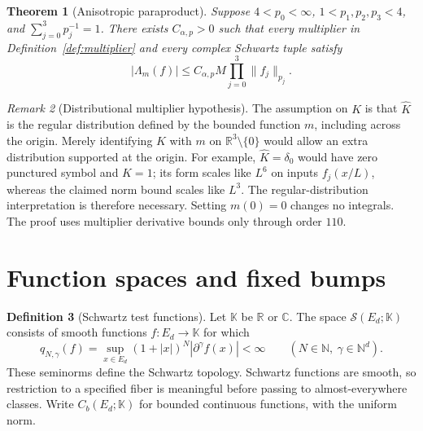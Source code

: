 \documentclass[12pt,reqno]{amsart}
\theoremstyle{plain}
\newtheorem{theorem}{Theorem}[section]
\theoremstyle{definition}
\newtheorem{definition}[theorem]{Definition}
\theoremstyle{remark}
\newtheorem{remark}[theorem]{Remark}
\numberwithin{equation}{section}
\newcommand{\R}{\mathbb R}
\newcommand{\C}{\mathbb C}
\newcommand{\N}{\mathbb N}
\newcommand{\Sp}{\mathcal S}
\begin{document}
\begin{theorem}[Anisotropic paraproduct]\label{thm:main}
Suppose $4<p_0<\infty$, $1<p_1,p_2,p_3<4$, and
$\sum_{j=0}^3p_j^{-1}=1$. There exists $C_{\alpha,p}>0$ such that
every multiplier in Definition~\ref{def:multiplier} and every complex
Schwartz tuple satisfy
\[
 |\Lambda_m(f)|\le C_{\alpha,p}M\prod_{j=0}^3\|f_j\|_{p_j}.
\]
\end{theorem}

\begin{remark}[Distributional multiplier hypothesis]\label{rem:distributional}
The assumption on $K$ is that $\widehat K$ is the regular distribution
defined by the bounded function $m$, including across the origin.
Merely identifying $\widehat K$ with $m$ on $\R^3\setminus\{0\}$
would allow an extra distribution supported at the origin. For example,
$\widehat K=\delta_0$ would have zero punctured symbol and $K=1$;
its form scales like $L^6$ on inputs $f_j(x/L)$, whereas the claimed
norm bound scales like $L^3$. The regular-distribution interpretation
is therefore necessary. Setting $m(0)=0$ changes no integrals.
The proof uses multiplier derivative bounds only through order $110$.
\end{remark}

\section{Function spaces and fixed bumps}

\begin{definition}[Schwartz test functions]\label{def:schwartz}
Let $\mathbb K$ be $\R$ or $\C$. The space $\Sp(E_d;\mathbb K)$
consists of smooth functions $f:E_d\to\mathbb K$ for which
\[
 q_{N,\gamma}(f)=\sup_{x\in E_d}(1+|x|)^N|\partial^\gamma f(x)|<\infty
 \qquad(N\in\N,\ \gamma\in\N^d).
\]
These seminorms define the Schwartz topology.
Schwartz functions are smooth, so restriction to a specified
fiber is meaningful before passing to almost-everywhere classes.
Write $C_b(E_d;\mathbb K)$ for bounded continuous functions, with
the uniform norm.
\end{definition}
\end{document}
